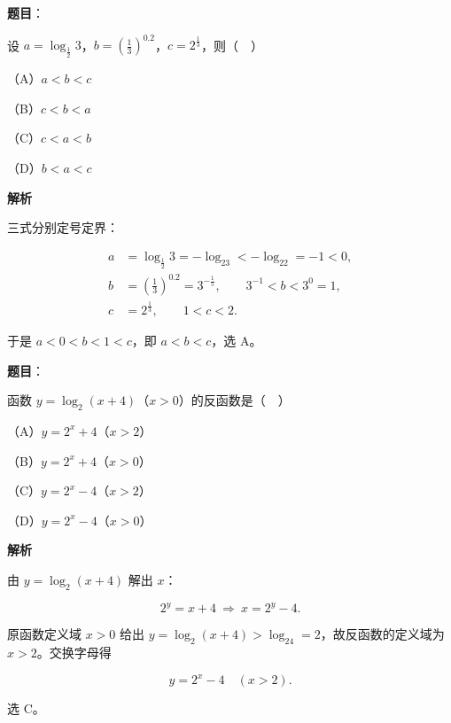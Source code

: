 \begin{answer}

\textbf{题目}：

设 $a=\log_{\frac12}3$，$b=\left(\frac13\right)^{0.2}$，$c=2^{\frac13}$，则（　）

（A）$a<b<c$

（B）$c<b<a$

（C）$c<a<b$

（D）$b<a<c$

\textbf{解析}

三式分别定号定界：

\nopagebreak[4]
\[
\begin{aligned}
a&=\log_{\frac12}3=-\log_23<-\log_22=-1<0,\\
b&=\left(\frac13\right)^{0.2}=3^{-\frac15},\qquad 3^{-1}<b<3^{0}=1,\\
c&=2^{\frac13},\qquad 1<c<2.
\end{aligned}
\]

于是 $a<0<b<1<c$，即 $a<b<c$，选 A。


\end{answer}
\begin{answer}

\textbf{题目}：

函数 $y=\log_2(x+4)$（$x>0$）的反函数是（　）

（A）$y=2^x+4$（$x>2$）

（B）$y=2^x+4$（$x>0$）

（C）$y=2^x-4$（$x>2$）

（D）$y=2^x-4$（$x>0$）

\textbf{解析}

由 $y=\log_2(x+4)$ 解出 $x$：

\nopagebreak[4]
\[2^y=x+4\ \Longrightarrow\ x=2^y-4 .\]

原函数定义域 $x>0$ 给出 $y=\log_2(x+4)>\log_24=2$，故反函数的定义域为 $x>2$。交换字母得

\nopagebreak[4]
\[y=2^x-4\quad(x>2).\]

选 C。


\end{answer}
